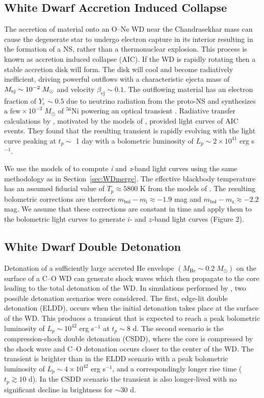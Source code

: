 \subsection{White Dwarf Accretion Induced Collapse}
\label{sec:AIC}
The accretion of material onto an O--Ne WD near the Chandrasekhar mass can cause the degenerate star to undergo electron capture in its interior resulting in the formation of a NS, rather than a thermonuclear explosion. This process is known as accretion induced collapse (AIC). If the WD is rapidly rotating then a stable accretion disk will form. The disk will cool and become radiatively inefficient, driving powerful outflows with a characteristic ejecta mass of $M_{\rm ej} \sim 10^{-2}\;M_{\odot}$ and velocity $\beta_{\text{ej}} \sim 0.1$. The outflowing material has an electron fraction of $Y_e \sim 0.5$ due to neutrino radiation from the proto-NS and synthesizes $\text{a few} \times 10^{-3}\; M_{\odot}$ of ${}^{56}$Ni powering an optical transient \citep{Metzger+09b}. Radiative transfer calculations by \citet{Darbha+10}, motivated by the models of \citet{Metzger+09b}, provided light curves of AIC events. They found that the resulting transient is rapidly evolving with the light curve peaking at $t_p \sim$ 1 day with a bolometric luminosity of $L_p \sim 2\times10^{41}$ erg s$^{-1}$.

We use the models of \citet{Dabhra+10} to compute \emph{i} and \emph{z}-band light curves using the same methodology as in Section~\ref{sec:WDmerge}. The effective blackbody temperature has an assumed fiducial value of $T_p \approx 5800$ K from the models of \citet[see their Figure 3]{Dabhra+10}. The resulting bolometric corrections are therefore $m_{\text{bol}} - m_{\text{i}} \approx -1.9$ mag and $m_{\text{bol}} - m_{\text{z}} \approx -2.2$ mag. We assume that these corrections are constant in time and apply them to the bolometric light curves to generate $i$- and $z$-band light curves (Figure 2).

\subsection{White Dwarf Double Detonation}
\label{sec:ELDD}
Detonation of a sufficiently large accreted He envelope $(M_{\text{He}} \sim 0.2\; M_{\odot})$ on the surface of a C--O WD can generate shock waves which then propagate to the core leading to the total detonation of the WD. In simulations performed by \citet{Sim+12}, two possible detonation scenarios were considered. The first, edge-lit double detonation (ELDD), occurs when the initial detonation takes place at the surface of the WD. This produces a transient that is expected to reach a peak bolometric luminosity of $L_p \sim 10^{42}$ erg s$^{-1}$ at $t_p \sim 8$ d. The second scenario is the compression-shock double detonation (CSDD), where the core is compressed by the shock wave and C--O detonation occurs closer to the center of the WD. The transient is brighter than in the ELDD scenario with a peak bolometric luminosity of $L _p \sim 4\times10^{42}$ erg s$^{-1}$, and a correspondingly longer rise time ($t_p  \gtrsim 10$ d). In the CSDD scenario the transient is also longer-lived with no significant decline in brightness for $\sim 30$ d.

